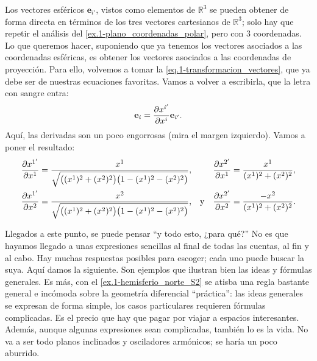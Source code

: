 \begin{example}
    Los vectores esféricos \(\mathbf{e}_{i'}\), vistos como elementos de \(\mathbb{R}^3\) se pueden obtener de forma directa en términos de los tres vectores cartesianos de \(\mathbb{R}^3\); solo hay que repetir el análisis del \cref{ex.1-plano_coordenadas_polar}, pero con 3 coordenadas. Lo que queremos hacer, suponiendo que ya tenemos los vectores asociados a las coordenadas esféricas, es obtener los vectores asociados a las coordenadas de proyección. Para ello, volvemos a tomar la \cref{eq.1-transformacion_vectores}, que ya debe ser de nuestras ecuaciones favoritas. Vamos a volver a escribirla, que la letra con sangre entra:
    \begin{equation}
        \mathbf{e}_{i} = \frac{\partial x^{i'}}{\partial x^{i}} \mathbf{e}_{i'}.
    \end{equation}
    Aquí, las derivadas son un poco engorrosas (mira el margen izquierdo). Vamos a poner el resultado:
    \begin{align*}
         \frac{\partial x^{1'}}{\partial x^{1}} &= \frac{x^{1}}{\sqrt{\big((x^1)^2 + (x^2)^2\big)\big(1 - (x^1)^2 - (x^2)^2\big)}}, & &&  \frac{\partial x^{2'}}{\partial x^{1}} &= \frac{x^{1}}{(x^{1})^2 + (x^{2})^2},\\
         \frac{\partial x^{1'}}{\partial x^{2}} &= \frac{x^{2}}{\sqrt{\big((x^1)^2 + (x^2)^2\big)\big(1 - (x^1)^2 - (x^2)^2\big)}}, & \text{y} &&  \frac{\partial x^{2'}}{\partial x^{2}} &= \frac{-x^{2}}{(x^{1})^2 + (x^{2})^2}.
    \end{align*}

    Llegados a este punto, se puede pensar ``y todo esto, ¿para qué?'' No es que hayamos llegado a unas expresiones sencillas al final de todas las cuentas, al fin y al cabo. Hay muchas respuestas posibles para escoger; cada uno puede buscar la suya. Aquí damos la siguiente. Son ejemplos que ilustran bien las ideas y fórmulas generales. Es más, con el \cref{ex.1-hemisferio_norte_S2} se atisba una regla bastante general e incómoda sobre la geometría diferencial ``práctica'': las ideas generales se expresan de forma simple, los casos particulares requieren fórmulas complicadas. Es el precio que hay que pagar por viajar a espacios interesantes. Además, aunque algunas expresiones sean complicadas, también lo es la vida. No va a ser todo planos inclinados y osciladores armónicos; se haría un poco aburrido. 
\end{example}

